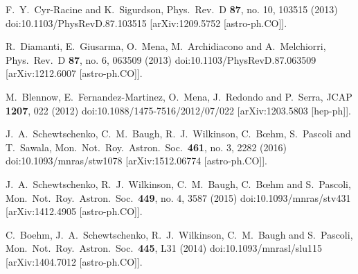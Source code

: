 \documentclass[aps,prd,a4paper,twocolumn,amsmath,showpacs,superscriptaddress,nofootinbib,preprintnumbers]{revtex4-1}
\begin{document}
\begin{thebibliography}{99}
  F.~Y.~Cyr-Racine and K.~Sigurdson,
  Phys.\ Rev.\ D {\bf 87}, no. 10, 103515 (2013)
  doi:10.1103/PhysRevD.87.103515
  [arXiv:1209.5752 [astro-ph.CO]].
  
  R.~Diamanti, E.~Giusarma, O.~Mena, M.~Archidiacono and A.~Melchiorri,
  Phys.\ Rev.\ D {\bf 87}, no. 6, 063509 (2013)
  doi:10.1103/PhysRevD.87.063509
  [arXiv:1212.6007 [astro-ph.CO]].
  
  M.~Blennow, E.~Fernandez-Martinez, O.~Mena, J.~Redondo and P.~Serra,
  JCAP {\bf 1207}, 022 (2012)
  doi:10.1088/1475-7516/2012/07/022
  [arXiv:1203.5803 [hep-ph]].
  
   
  J.~A.~Schewtschenko, C.~M.~Baugh, R.~J.~Wilkinson, C.~Bœhm, S.~Pascoli and T.~Sawala,
  Mon.\ Not.\ Roy.\ Astron.\ Soc.\  {\bf 461}, no. 3, 2282 (2016)
  doi:10.1093/mnras/stw1078
  [arXiv:1512.06774 [astro-ph.CO]].
  
  J.~A.~Schewtschenko, R.~J.~Wilkinson, C.~M.~Baugh, C.~Bœhm and S.~Pascoli,
  Mon.\ Not.\ Roy.\ Astron.\ Soc.\  {\bf 449}, no. 4, 3587 (2015)
  doi:10.1093/mnras/stv431
  [arXiv:1412.4905 [astro-ph.CO]].
  
  C.~Boehm, J.~A.~Schewtschenko, R.~J.~Wilkinson, C.~M.~Baugh and S.~Pascoli,
  Mon.\ Not.\ Roy.\ Astron.\ Soc.\  {\bf 445}, L31 (2014)
  doi:10.1093/mnrasl/slu115
  [arXiv:1404.7012 [astro-ph.CO]].
  

\end{thebibliography}
\end{document}
